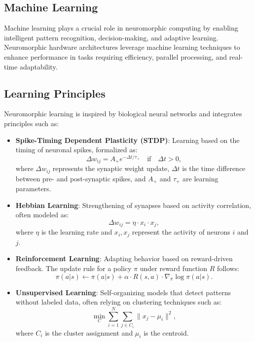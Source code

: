 \documentclass{article}
\theoremstyle{plain}
\begin{document}
\begin{itemize}
\begin{itemize}
\section{Machine Learning}

Machine learning plays a crucial role in neuromorphic computing by enabling intelligent pattern recognition, decision-making, and adaptive learning. Neuromorphic hardware architectures leverage machine learning techniques to enhance performance in tasks requiring efficiency, parallel processing, and real-time adaptability.

\subsection{Learning Principles}
Neuromorphic learning is inspired by biological neural networks and integrates principles such as:
\begin{itemize}
    \item \textbf{Spike-Timing Dependent Plasticity (STDP)}: Learning based on the timing of neuronal spikes, formalized as:
    \begin{equation}
        \Delta w_{ij} = A_+ e^{-\Delta t/\tau_+} \quad \text{if} \quad \Delta t > 0,
    \end{equation}
    where $\Delta w_{ij}$ represents the synaptic weight update, $\Delta t$ is the time difference between pre- and post-synaptic spikes, and $A_+$ and $\tau_+$ are learning parameters.
    
    \item \textbf{Hebbian Learning}: Strengthening of synapses based on activity correlation, often modeled as:
    \begin{equation}
        \Delta w_{ij} = \eta \cdot x_i \cdot x_j,
    \end{equation}
    where $\eta$ is the learning rate and $x_i, x_j$ represent the activity of neurons $i$ and $j$.
    
    \item \textbf{Reinforcement Learning}: Adapting behavior based on reward-driven feedback. The update rule for a policy $\pi$ under reward function $R$ follows:
    \begin{equation}
        \pi(a|s) \leftarrow \pi(a|s) + \alpha \cdot R(s,a) \cdot \nabla_{\pi} \log \pi(a|s).
    \end{equation}
    
    \item \textbf{Unsupervised Learning}: Self-organizing models that detect patterns without labeled data, often relying on clustering techniques such as:
    \begin{equation}
        \min_{C} \sum_{i=1}^{N} \sum_{j \in C_i} \|x_j - \mu_i\|^2,
    \end{equation}
    where $C_i$ is the cluster assignment and $\mu_i$ is the centroid.
\end{itemize}


\end{itemize}
\end{itemize}
\end{document}
